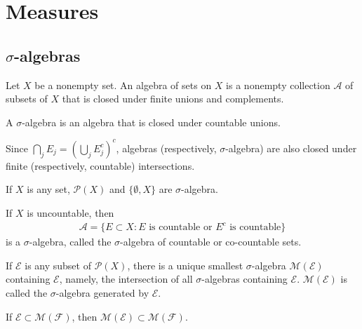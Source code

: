\setchapterpreamble[u]{\margintoc}
\chapter{Measures}

\section{\texorpdfstring{$\sigma$}{sigma}-algebras}

\begin{definition}[Algebra]
    Let $X$ be a nonempty set.
    An algebra of sets on $X$ is a nonempty collection $\mathcal{A}$ of subsets of $X$ that is closed under finite unions and complements.
\end{definition}

\begin{definition}
    A $\sigma$-algebra is an algebra that is closed under countable unions.
\end{definition}

Since $\bigcap_{j} E_j = (\bigcup_{j} E_j^c)^c$, algebras (respectively, $\sigma$-algebra) are also closed under finite (respectively, countable) intersections.

\begin{example}
    If $X$ is any set, $\mathcal{P}(X)$ and $\{ \emptyset, X \}$ are $\sigma$-algebra.
\end{example}

\begin{example}
    If $X$ is uncountable, then
    \begin{align}
        \mathcal{A} = \{ E \subset X : E \text{ is countable or } E^{c} \text{ is countable} \}
    \end{align}
    is a $\sigma$-algebra, called the $\sigma$-algebra of countable or co-countable sets.
\end{example}

\begin{definition}
    If $\mathcal{E}$ is any subset of $\mathcal{P}(X)$, there is a unique smallest $\sigma$-algebra $\mathcal{M}(\mathcal{E})$ containing $\mathcal{E}$, namely, the intersection of all $\sigma$-algebras containing $\mathcal{E}$.
    $\mathcal{M}(\mathcal{E})$ is called the $\sigma$-algebra generated by $\mathcal{E}$.
\end{definition}

\begin{lemma}
    If $\mathcal{E} \subset \mathcal{M}(\mathcal{F})$, then $\mathcal{M}(\mathcal{E}) \subset \mathcal{M}(\mathcal{F})$.
\end{lemma}

